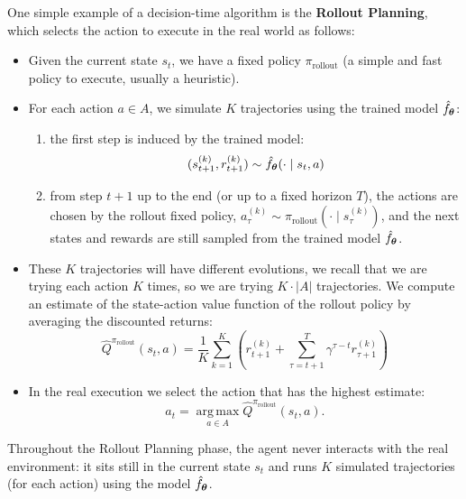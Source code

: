 \documentclass[10pt, a4paper]{report}
\begin{document}
\noindent One simple example of a decision-time algorithm is the \textbf{Rollout Planning}, which selects the action to execute in the real world as follows:\begin{itemize}
    \item Given the current state $s_t$, we have a fixed policy $\pi_{\text{rollout}}$ (a simple and fast policy to execute, usually a heuristic).
    \item For each action $a\in A$, we simulate $K$ trajectories using the trained model $\hat f_{\boldsymbol{\theta}}$:\begin{enumerate}
        \item the first step is induced by the trained model:\begin{equation}
            (s^{(k)}_{t+1},r^{(k)}_{t+1})\sim \hat f_{\boldsymbol{\theta}}(\cdot\mid s_t,a)
        \end{equation}
        \item from step $t+1$ up to the end (or up to a fixed horizon $T$), the actions are chosen by the rollout fixed policy, $a^{(k)}_\tau\sim\pi_\text{rollout}(\cdot\mid s^{(k)}_\tau)$, and the next states and rewards are still sampled from the trained model $\hat f_{\boldsymbol{\theta}}$.
    \end{enumerate}
    \item These $K$ trajectories will have different evolutions, we recall that we are trying each action $K$ times, so we are trying $K\cdot |A|$ trajectories. We compute an estimate of the state-action value function of the rollout policy by averaging the discounted returns:\begin{equation}
        \widehat Q^{\pi_\text{rollout}}(s_t,a)=\frac{1}{K}\sum_{k=1}^{K}\left(
            r_{t+1}^{(k)}+\sum_{\tau=t+1}^{T}\gamma^{\tau-t}r_{\tau+1}^{(k)}
        \right)
    \end{equation}
    \item In the real execution we select the action that has the highest estimate:\begin{equation}
        a_t=\operatorname*{arg\,max}_{a\in A}\widehat Q^{\pi_\text{rollout}}(s_t,a).
    \end{equation}
\end{itemize}
Throughout the Rollout Planning phase, the agent never interacts with the real environment: it sits still in the current state $s_t$ and runs $K$ simulated trajectories (for each action) using the model $\hat f_{\boldsymbol{\theta}}$.
\end{document}
